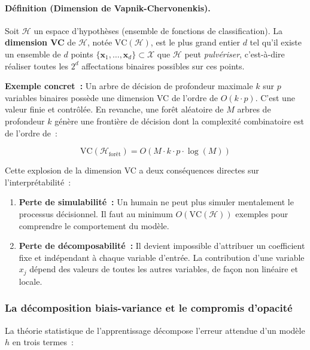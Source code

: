 \paragraph{Définition (Dimension de Vapnik-Chervonenkis).}
Soit $\mathcal{H}$ un espace d'hypothèses (ensemble de fonctions de classification). La
\textbf{dimension VC} de $\mathcal{H}$, notée $\mathrm{VC}(\mathcal{H})$, est le plus grand
entier $d$ tel qu'il existe un ensemble de $d$ points $\{\mathbf{x}_1, \ldots, \mathbf{x}_d\} \subset \mathcal{X}$
que $\mathcal{H}$ peut \textit{pulvériser}, c'est-à-dire réaliser toutes les $2^d$
affectations binaires possibles sur ces points.

\textbf{Exemple concret~:} Un arbre de décision de profondeur maximale $k$ sur $p$ variables
binaires possède une dimension VC de l'ordre de $O(k \cdot p)$. C'est une valeur finie et
contrôlée. En revanche, une forêt aléatoire de $M$ arbres de profondeur $k$ génère une
frontière de décision dont la complexité combinatoire est de l'ordre de~:

\begin{equation}
  \mathrm{VC}(\mathcal{H}_{\text{forêt}}) = O\!\left(M \cdot k \cdot p \cdot \log(M)\right)
  \label{eq:vc_foret}
\end{equation}

Cette explosion de la dimension VC a deux conséquences directes sur l'interprétabilité~:

\begin{enumerate}
  \item \textbf{Perte de simulabilité~:} Un humain ne peut plus simuler mentalement
        le processus décisionnel. Il faut au minimum $O(\mathrm{VC}(\mathcal{H}))$ exemples pour
        comprendre le comportement du modèle.

  \item \textbf{Perte de décomposabilité~:} Il devient impossible d'attribuer
        un coefficient fixe et indépendant à chaque variable d'entrée. La contribution
        d'une variable $x_j$ dépend des valeurs de toutes les autres variables, de façon
        non linéaire et locale.
\end{enumerate}

\subsubsection{La décomposition biais-variance et le compromis d'opacité}

La théorie statistique de l'apprentissage décompose l'erreur attendue d'un modèle $h$ en
trois termes~:

